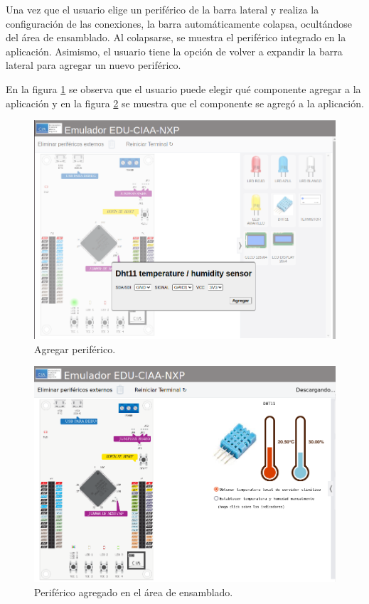 Una vez que el usuario elige un periférico de la barra lateral y realiza la configuración de las conexiones, la barra automáticamente colapsa, ocultándose del área de ensamblado. Al colapsarse, se muestra el periférico integrado en la aplicación. Asimismo,  el usuario tiene la opción de volver a expandir la barra lateral para agregar un nuevo periférico.


En la figura \ref{fig:AgregarPeriferico} se observa que el usuario puede elegir qué componente agregar a la aplicación y en la figura \ref{fig:AgregarPeriferico2} se muestra que el componente se agregó a la aplicación.
\hfill \break
\hfill \break
\hfill \break
\hfill \break
\hfill \break
\hfill \break
\hfill \break
\hfill \break
\hfill \break
\hfill \break
\hfill \break
\hfill \break
\hfill \break
\hfill \break
\hfill \break
\hfill \break
\hfill \break

\begin{figure}[ht]
	\centering
	\includegraphics[scale=.41]{./Figures/AgregarPeriferico.png}
	\caption{Agregar periférico.}
	\label{fig:AgregarPeriferico}
\end{figure}


\begin{figure}[ht]
	\centering
	\includegraphics[scale=.41]{./Figures/AgregarPeriferico2.png}
	\caption{Periférico agregado en el área de ensamblado. }
	\label{fig:AgregarPeriferico2}
\end{figure}


